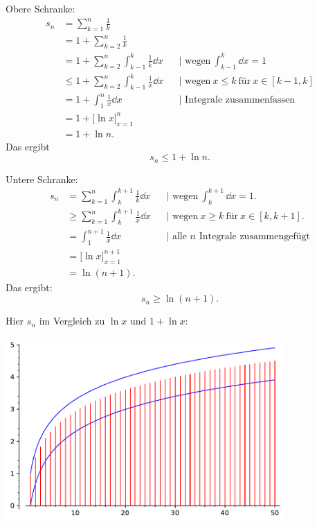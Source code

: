 \begin{bsp}
	
	
	Obere Schranke: 
	\begin{align*}
		s_n & = \sum_{k=1}^n \frac{1}{k} 
		\\ & = 1 + \sum_{k=2}^n \frac{1}{k}
		\\ & = 1 + \sum_{k=2}^n \int_{k-1}^k \frac{1}{k} \dd x & & |\text{ wegen} \ \int_{k-1}^k \dd x = 1
		\\ & \le 1 + \sum_{k=2}^n \int_{k-1}^k \frac{1}{x} \dd x & & |\text{ wegen} \ x \le k \ \text{für} \ x \in [k-1,k]
		\\ & = 1 + \int_1^n \frac{1}{x} \dd x & & |\text{ Integrale zusammenfassen}
		\\ & = 1 + \biggl[ \ln x \biggr]_{x=1}^n
		\\ & = 1 + \ln n.
	\end{align*}
	Das ergibt
	\[
		s_n \le 1 + \ln n.
	\]
	
	
	Untere Schranke: 
	\begin{align*}
		s_n & = \sum_{k=1}^n \int_k^{k+1} \frac{1}{k} \dd x  & & |\text{ wegen} \ \int_k^{k+1} \dd x = 1.
		\\ & \ge \sum_{k=1}^n \int_k^{k+1} \frac{1}{x} \dd x & & |\text{ wegen} \ x \ge k \  \text{für} \ x \in [k,k+1].
		\\ & = \int_1^{n+1} \frac{1}{x} \dd x & & |\text{ alle $n$ Integrale zusammengefügt}
		\\  & = \biggl[ \ln x \biggr]_{x=1}^{n+1} 
		\\ & = \ln (n+1). 
	\end{align*}
	Das ergibt: 
	\[
		s_n \ge \ln (n+1). 
	\]
	
	Hier $s_n$ im Vergleich zu $\ln x$ und $1 + \ln x$: 
	
	\begin{center}
		\includegraphics[width=0.8\textwidth]{pics/partial_sums_harmonic_series.pdf} 
	\end{center} 
\end{bsp} 

